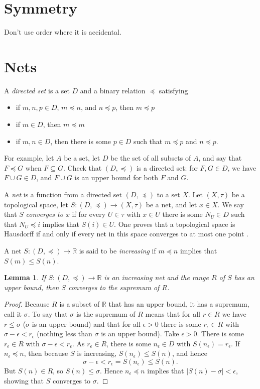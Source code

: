 \documentclass{article}
\newtheorem{lemma}[theorem]{Lemma}
\begin{document}
\section{Symmetry}
Don't use order where it is accidental.


\section{Nets}
A {\em directed set} is a set $D$ and a binary relation $\preceq$ satisfying
\begin{itemize}
\item if $m,n,p \in D$, $m \preceq n$, and $n\preceq p$, then $m \preceq p$
\item if $m \in D$, then $m \preceq m$
\item if $m,n \in D$, then there is some $p \in D$ such that $m \preceq p$ and $n \preceq p$.
\end{itemize}
For example, let $A$ be a set, let $D$  be the set of all subsets of $A$, and say that  $F \preceq G$ when $F \subseteq G$. Check that 
$(D,\preceq)$ is a directed set: for $F,G \in D$, we have $F \cup G \in D$,
and $F \cup G$  is an upper bound for both $F$ and $G$. 

A {\em net} is a function from a directed set $(D,\preceq)$ to a set $X$. 
Let $(X,\tau)$ be a topological space, let $S:(D,\preceq) \to (X,\tau)$ be a net, and let $x \in X$. We say that $S$ {\em converges to $x$} if for every $U \in \tau$ with $x \in U$
 there is some $N_U \in D$ such that $N_U \preceq i$ implies that $S(i) \in U$. One proves that a topological space is Hausdorff if and only if every net in this space converges to at most one
point  \cite[p.~67, Theorem 3]{kelley}.

A net $S:(D,\preceq) \to \mathbb{R}$ is said to be {\em increasing} if $m \preceq n$ implies that $S(m) \leq S(n)$.

\begin{lemma}
If $S:(D,\preceq) \to \mathbb{R}$ is an increasing net and the range $R$ of $S$ has an upper bound, then $S$ converges to the supremum  of $R$.
\label{monotone}
\end{lemma}
\begin{proof}
Because $R$ is a subset of $\mathbb{R}$ that has an upper bound, it has a supremum, call it $\sigma$. To say that $\sigma$ is the supremum of $R$ means that
for all $r \in R$ we have $r \leq \sigma$ ($\sigma$ is an upper bound) and that for all $\epsilon>0$ there is some $r_\epsilon \in R$ with $\sigma-\epsilon<r_\epsilon$ (nothing less than 
$\sigma$ is an upper bound).
Take $\epsilon>0$. There is some $r_\epsilon \in R$ with $\sigma-\epsilon<r_\epsilon$.  As $r_\epsilon \in R$,
there is some $n_\epsilon \in D$ with $S(n_\epsilon) = r_\epsilon$. If $n_\epsilon \preceq n$, then because $S$ is increasing,
$S(n_\epsilon) \leq S(n)$, and hence
\[
\sigma-\epsilon < r_\epsilon = S(n_\epsilon) \leq S(n).
\]
But $S(n) \in R$, so $S(n) \leq \sigma$. Hence $n_\epsilon \preceq n$ implies that $|S(n)-\sigma|<\epsilon$, showing that $S$
converges to $\sigma$.
\end{proof}
\end{document}
